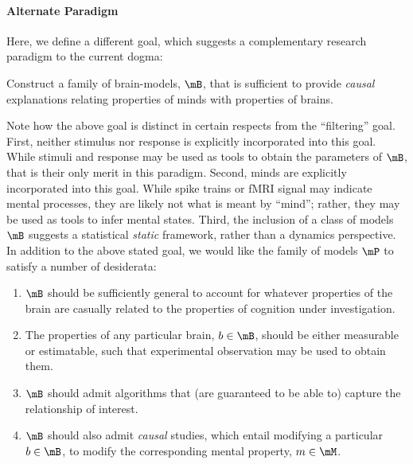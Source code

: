 \paragraph{Alternate Paradigm}

Here, we define a different goal, which suggests a complementary research paradigm to the current dogma: %

\begin{goal}
	Construct a family of brain-models, $\mB$, that is sufficient to provide \emph{causal} explanations relating properties of minds with properties of brains.
\end{goal}

Note how the above goal is distinct in certain respects from the ``filtering'' goal.  First, neither stimulus nor response is explicitly incorporated into this goal.  While stimuli and response may be used as tools to obtain the parameters of $\mB$, that is their only merit in this paradigm.  Second, minds are explicitly incorporated into this goal.  While spike trains or fMRI signal may indicate mental processes, they are likely not what is meant by ``mind''; rather, they may be used as tools to infer mental states.  Third, the inclusion of a class of models $\mB$  suggests a statistical \emph{static} framework, rather than a dynamics perspective.  In addition to the above stated goal, we would like the family of models $\mP$ to satisfy a number of desiderata:

\begin{enumerate}
	\item $\mB$ %
	should be sufficiently general to account for whatever properties of the brain are casually related to the properties of cognition under investigation.
	\item The properties of any particular brain, $b\in \mB$, should be either measurable or estimatable, such that experimental observation may be used to obtain them.
	\item $\mB$ should admit algorithms that (are guaranteed to be able to) capture the relationship of interest.
	\item $\mB$ should also admit \emph{causal} studies, which entail modifying a particular $b \in \mB$, to modify the corresponding mental property, $m \in \mM$.
\end{enumerate}


